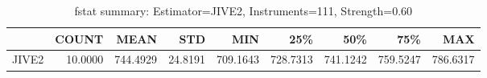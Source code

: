 \begin{table}[ht]
\centering
\caption{fstat summary: Estimator=JIVE2, Instruments=111, Strength=0.60}
\begin{tabular}{lrrrrrrrr}
\toprule
 & COUNT & MEAN & STD & MIN & 25\% & 50\% & 75\% & MAX \\
\midrule
JIVE2 & 10.0000 & 744.4929 & 24.8191 & 709.1643 & 728.7313 & 741.1242 & 759.5247 & 786.6317 \\
\bottomrule
\end{tabular}
\end{table}
